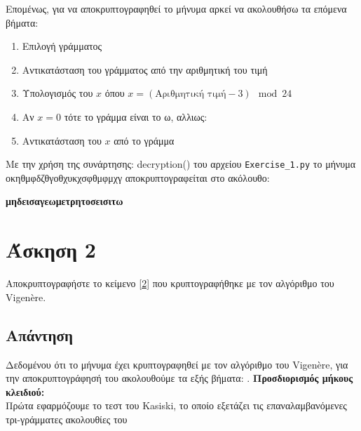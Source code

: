 \documentclass[12pt]{article}
\begin{document}
Επομένως, για να αποκρυπτογραφηθεί το μήνυμα αρκεί να ακολουθήσω τα επόμενα βήματα:
\begin{enumerate}
    \item Επιλογή γράμματος
    \item Αντικατάσταση του γράμματος από την αριθμητική του τιμή
    \item Υπολογισμός του \( x \) όπου \( x = (\text{Αριθμητική τιμή} - 3) \mod 24 \)
    \item Αν \( x = 0 \) τότε το γράμμα είναι το ω, αλλιως: 
    \item Αντικατάσταση του \( x \) από το γράμμα
\end{enumerate}

Με την χρήση της συνάρτησης: decryption() του αρχείου \texttt{Exercise\_1.py} το μήνυμα οκηθμφδζθγοθχυκχσφθμφμχγ 
\newline
αποκρυπτογραφείται στο ακόλουθο:
\begin{center}
    \textbf{μηδεισαγεωμετρητοσεισιτω}
\end{center}
\hfill \blacksquare

\newpage
\section*{Άσκηση 2}
Αποκρυπτογραφήστε το κείμενο  
\textcolor{blue}{\href{https://github.com/drazioti/book_crypto/blob/master/symmetric_crypto/vigenere}{[2]}} που κρυπτογραφήθηκε με τον αλγόριθμο του Vigen\`ere.


\subsection*{Απάντηση}

Δεδομένου ότι το μήνυμα έχει κρυπτογραφηθεί με τον αλγόριθμο του Vigen\`ere, για την αποκρυπτογράφησή του ακολουθούμε τα εξής βήματα:
\newline
{}. \textbf{Προσδιορισμός μήκους κλειδιού:}\\
   Πρώτα εφαρμόζουμε το τεστ του Kasiski, το οποίο εξετάζει τις επαναλαμβανόμενες τρι-γράμματες ακολουθίες του 
   
\end{document}
